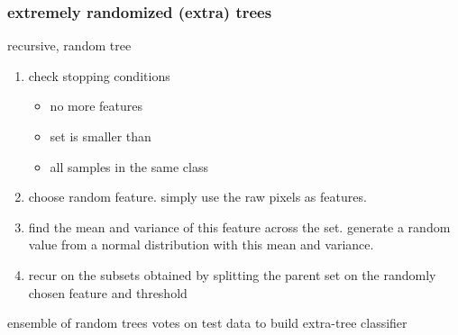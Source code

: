 \begin{frame}
  \frametitle{extremely randomized (extra) trees}

  recursive, random tree
  \begin{enumerate}
  \item check stopping conditions
    \begin{itemize}
    \item no more features
    \item set is smaller than 
    \item all samples in the same class
    \end{itemize}
  \item choose random feature. simply use the raw pixels as features. 
  \item find the mean and variance of this feature across the set. generate a random value from a normal distribution with this mean and variance. 
  \item recur on the subsets obtained by splitting the parent set on the randomly chosen feature and threshold
  \end{enumerate}

  ensemble of random trees votes on test data to build extra-tree classifier

\end{frame}
